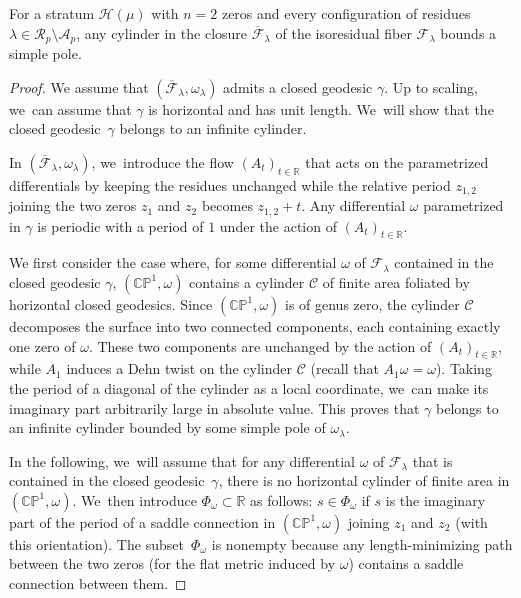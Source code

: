 \begin{prop}\label{prop:cylinder}
For a stratum $\mathcal{H}(\mu)$ with $n=2$ zeros and every configuration of residues $\lambda \in \mathcal{R}_{p} \setminus \mathcal{A}_{p}$, any cylinder in the closure $\overline{\mathcal{F}}_{\lambda}$ of the isoresidual fiber $\mathcal{F}_{\lambda}$ bounds a simple pole.
\end{prop}

\begin{proof}
We assume that $(\overline{\mathcal{F}}_{\lambda},\omega_{\lambda})$ admits a closed geodesic $\gamma$. Up to scaling, we~can assume that $\gamma$ is horizontal and has unit length. We~will show that the closed geodesic~$\gamma$ belongs to an infinite cylinder.

In $(\overline{\mathcal{F}}_{\lambda},\omega_{\lambda})$, we~introduce the flow $(A_{t})_{t \in \mathbb{R}}$ that acts on the parametrized differentials by keeping the residues unchanged while the relative period $z_{1,2}$ joining the two zeros $z_1$ and $z_2$ becomes $z_{1,2}+t$. Any differential $\omega$ parametrized in $\gamma$ is periodic with a period of $1$ under the action of $(A_{t})_{t \in \mathbb{R}}$.

We first consider the case where, for some differential $\omega$ of $\mathcal{F}_{\lambda}$ contained in the closed geodesic $\gamma$, $(\mathbb{CP}^{1},\omega)$ contains a cylinder $\mathcal{C}$ of finite area foliated by horizontal closed geodesics. Since $(\mathbb{CP}^{1},\omega)$ is of genus zero, the cylinder $\mathcal{C}$ decomposes the surface into two connected components, each containing exactly one zero of $\omega$. These two components are unchanged by the action of $(A_{t})_{t \in \mathbb{R}}$, while $A_{1}$ induces a Dehn twist on the cylinder $\mathcal{C}$ (recall that $A_{1}\omega=\omega$). Taking the period of a diagonal of the cylinder as a local coordinate, we~can make its imaginary part arbitrarily large in absolute value. This proves that $\gamma$ belongs to an infinite cylinder bounded by some simple pole of $\omega_{\lambda}$.

In the following, we~will assume that for any differential $\omega$ of $\mathcal{F}_{\lambda}$ that is contained in the closed geodesic~$\gamma$, there is no horizontal cylinder of finite area in $(\mathbb{CP}^{1},\omega)$. We~then introduce $\Phi_{\omega} \subset \mathbb{R}$ as follows: $s \in \Phi_{\omega}$ if $s$ is the imaginary part of the period of a saddle connection in $(\mathbb{CP}^{1},\omega)$ joining $z_1$ and $z_2$ (with this orientation). The subset~$\Phi_{\omega}$ is nonempty because any length-minimizing path between the two zeros (for the flat metric induced by $\omega$) contains a saddle connection between them.


\end{proof}
